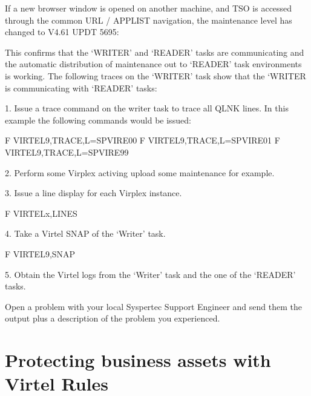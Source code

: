 \documentclass[letterpaper,10pt,english]{sphinxmanual}
\begin{document}
\sphinxAtStartPar
{}

\sphinxAtStartPar
If a new browser window is opened on another machine, and TSO is accessed through the common URL / APPLIST navigation, the maintenance level has changed to V4.61 UPDT 5695:\sphinxhyphen{}

\sphinxAtStartPar
{}

\sphinxAtStartPar
This confirms that the ‘WRITER’ and ‘READER’ tasks are communicating and the automatic distribution of maintenance out to ‘READER’ task environments is working. The following traces on the ‘WRITER’ task show that the ‘WRITER is communicating with ‘READER’ tasks:\sphinxhyphen{}

\sphinxAtStartPar
{}

\ignorespaces 
\sphinxAtStartPar
{}

\begin{sphinxVerbatim}[commandchars=\\\{\}]
1.  Issue a trace command on the writer task to trace all QLNK lines. In this example the following commands would be issued:\PYGZhy{}

F VIRTEL9,TRACE,L=SPVIRE00
F VIRTEL9,TRACE,L=SPVIRE01
F VIRTEL9,TRACE,L=SPVIRE99


2.  Perform some Virplex activing \textendash{} upload some maintenance for example.

3.  Issue a line display for each Virplex instance.

F VIRTELx,LINES

4.  Take a Virtel SNAP of the ‘Writer’ task.

F VIRTEL9,SNAP

5.  Obtain the Virtel logs from the ‘Writer’ task and the one of the ‘READER’ tasks.

Open a problem with your local Syspertec Support Engineer and send them the output plus a description of the problem you experienced.
\end{sphinxVerbatim}

\ignorespaces 

\chapter{Protecting business assets with Virtel Rules}
\label{\detokenize{connectivity_guide:protecting-business-assets-with-virtel-rules}}\label{\detokenize{connectivity_guide:index-187}}
\end{document}
